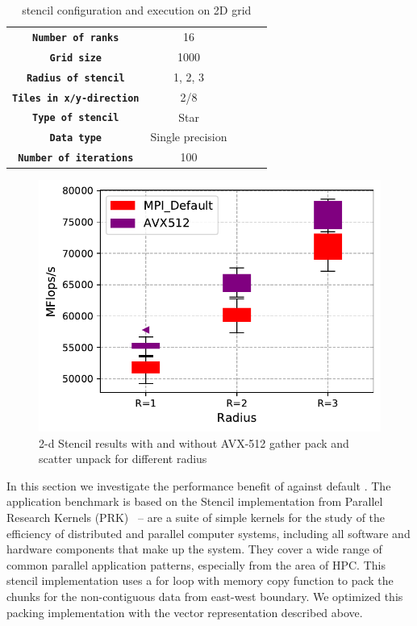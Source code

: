 \documentclass[conference]{IEEEtran}
\begin{document}
\begin{table}[h]
  \centering
  \caption{\mpi stencil configuration and execution on 2D grid}\label{tab:ewconfig}
  \small
  \begin{tabular}{cclll}
    \toprule
    \midrule
      \texttt{\bf Number of ranks} & 16 \\
      \texttt{\bf Grid size} & 1000 \\
      \texttt{\bf Radius of stencil} & 1, 2, 3 \\
      \texttt{\bf Tiles in x/y-direction} & 2/8 \\
      \texttt{\bf Type of stencil} & Star \\
      \texttt{\bf Data type} & Single precision \\
      \texttt{\bf Number of iterations} & 100 \\
      \bottomrule
  \end{tabular}
\end{table}

\begin{figure}[h]
    \centering
    \includegraphics[width=\linewidth]{stencil_diff_radius.pdf}
    \caption{2-d Stencil results with and without AVX-512 gather pack and scatter unpack for different radius}
    \label{fig:stencil_diff_radius}
\end{figure}

In this section we investigate the performance benefit of \ourwork against default \ompi.
The application benchmark is based on the Stencil \mpi implementation from Parallel
Research Kernels (PRK)~\cite{mpistencil,PRK2014} -- are a suite of simple kernels for the study of the efficiency
of distributed and parallel computer systems, including all software and hardware components that make up the system.
They cover a wide range of common parallel application patterns, especially from the area of HPC.
This stencil implementation uses a for loop with memory copy function to pack the chunks for the non-contiguous data from east-west boundary.
We optimized this packing implementation with the vector representation described above.
\end{document}
